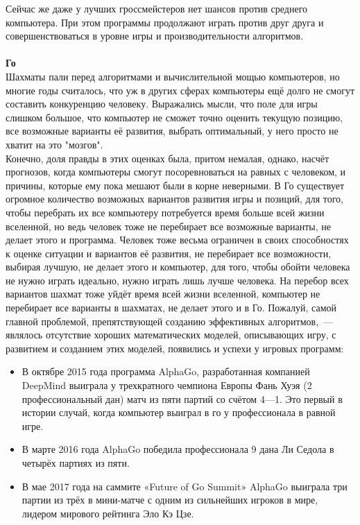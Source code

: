Сейчас же даже у лучших гроссмейстеров нет шансов против среднего компьютера\cite{chess_human_has_no_chance}. При этом программы продолжают играть против друг друга и совершенствоваться в уровне игры и производительности алгоритмов.\\\\

\textbf{Го}\\
Шахматы пали перед алгоритмами и вычислительной мощью компьютеров, но многие годы считалось, что уж в других сферах компьютеры ещё долго не смогут составить конкуренцию человеку. Выражались мысли, что поле для игры слишком большое, что компьютер не сможет точно оценить текущую позицию, все возможные варианты её развития, выбрать оптимальный, у него просто не хватит на это "мозгов"\cite{go_is_hard}\cite{go_is_hard2}.\\

Конечно, доля правды в этих оценках была, притом немалая, однако, насчёт прогнозов, когда компьютеры смогут посоревноваться на равных с человеком, и причины, которые ему пока мешают были в корне неверными. В Го существует огромное количество возможных вариантов развития игры и позиций, для того, чтобы перебрать их все компьютеру потребуется время больше всей жизни вселенной, но ведь человек тоже не перебирает все возможные варианты, не делает этого и программа. Человек тоже весьма ограничен в своих способностях к оценке ситуации и вариантов её развития, не перебирает все возможности, выбирая лучшую, не делает этого и компьютер, для того, чтобы обойти человека не нужно играть идеально, нужно играть лишь лучше человека. На перебор всех вариантов шахмат тоже уйдёт время всей жизни вселенной, компьютер не перебирает все варианты в шахматах, не делает этого и в Го. Пожалуй, самой главной проблемой, препятствующей созданию эффективных алгоритмов,~--- являлось отсутствие хороших математических моделей, описывающих игру, с развитием и созданием этих моделей, появились и успехи у игровых программ:\\

\begin{itemize}
    \item В октябре 2015 года программа AlphaGo, разработанная компанией DeepMind выиграла у трехкратного чемпиона Европы Фань Хуэя (2 профессиональный дан) матч из пяти партий со счётом 4—1. Это первый в истории случай, когда компьютер выиграл в го у профессионала в равной игре.
    \item В марте 2016 года AlphaGo победила профессионала 9 дана Ли Седола в четырёх партиях из пяти.
    \item В мае 2017 года на саммите «Future of Go Summit» AlphaGo выиграла три партии из трёх в мини-матче с одним из сильнейших игроков в мире, лидером мирового рейтинга Эло Кэ Цзе.
\end{itemize}






